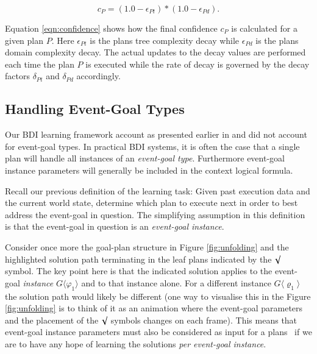 \begin{equation}\label{eqn:confidence}   
c_P = (1.0 - \epsilon_{Pt}) * (1.0 - \epsilon_{Pd}).
\end{equation}

Equation \ref{eqn:confidence} shows how the final confidence $c_P$ is calculated for a given plan $P$. Here $\epsilon_{Pt}$ is the plans tree complexity decay while $\epsilon_{Pd}$ is the plans domain complexity decay. The actual updates to the decay values are performed each time the plan $P$ is executed while the rate of decay is governed by the decay factors $\delta_{Pt}$ and $\delta_{Pd}$ accordingly.


\subsection{Handling Event-Goal Types}

Our BDI learning framework account as presented earlier in \cite{Airiau:IJAT:09} and \cite{Singh:AAMAS10} did not account for event-goal types. In practical BDI systems, it is often the case that a single plan will handle all instances of an \textit{event-goal type}. Furthermore event-goal instance parameters will generally be included in the context logical formula. 

Recall our previous definition of the learning task: Given past execution data and the current world state, determine which plan to execute next in order to best address the event-goal in question. The simplifying assumption in this definition is that the event-goal in question is an \textit{event-goal instance}. 

Consider once more the goal-plan structure in Figure \ref{fig:unfolding} and the highlighted solution path terminating in the leaf plans indicated by the $\surd$ symbol. The key point here is that the indicated solution applies to the event-goal \textit{instance} $G\langle\varphi_1\rangle$ and to that instance alone. For a different instance $G\langle\varrho_1\rangle$ the solution path would likely be different (one way to visualise this in the Figure \ref{fig:unfolding} is to think of it as an animation where the event-goal parameters and the placement of the $\surd$ symbols changes on each frame).  This means that event-goal instance parameters must also be considered as input for a plans \dt\, if we are to have any hope of learning the solutions \textit{per event-goal instance}.

